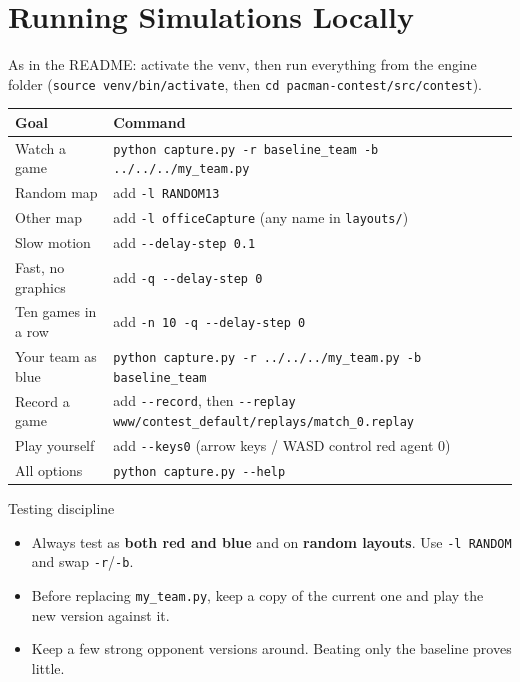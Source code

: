 \documentclass[11pt,a4paper]{article}
\begin{document}
\section{Running Simulations Locally}

As in the README: activate the venv, then run everything from the engine folder
(\nolinkurl{source venv/bin/activate}, then \nolinkurl{cd pacman-contest/src/contest}).

\begin{center}
\begin{tabularx}{\linewidth}{@{}lX@{}}
\toprule
\textbf{Goal} & \textbf{Command} \\
\midrule
Watch a game & \nolinkurl{python capture.py -r baseline_team -b ../../../my_team.py} \\
Random map & add \texttt{-l RANDOM13} \\
Other map & add \texttt{-l officeCapture} (any name in \texttt{layouts/}) \\
Slow motion & add \texttt{-{}-delay-step 0.1} \\
Fast, no graphics & add \texttt{-q -{}-delay-step 0} \\
Ten games in a row & add \texttt{-n 10 -q -{}-delay-step 0} \\
Your team as blue & \nolinkurl{python capture.py -r ../../../my_team.py -b baseline_team} \\
Record a game & add \texttt{-{}-record}, then \nolinkurl{--replay www/contest_default/replays/match_0.replay} \\
Play yourself & add \texttt{-{}-keys0} (arrow keys / WASD control red agent 0) \\
All options & \texttt{python capture.py -{}-help} \\
\bottomrule
\end{tabularx}
\end{center}

\begin{warnbox}{Testing discipline}
\begin{itemize}
  \item Always test as \textbf{both red and blue} and on \textbf{random layouts}. Use \texttt{-l RANDOM} and swap \texttt{-r}/\texttt{-b}.
  \item Before replacing \texttt{my\_team.py}, keep a copy of the current one and play the new version against it.
  \item Keep a few strong opponent versions around. Beating only the baseline proves little.
\end{itemize}
\end{warnbox}
\end{document}
